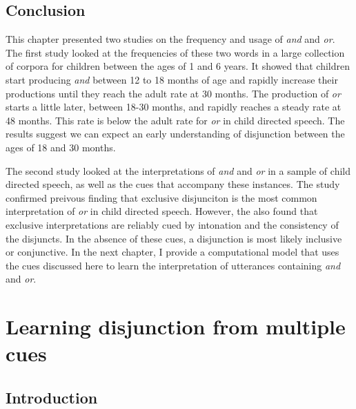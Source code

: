 \documentclass[oneside]{report}
\theoremstyle{definition}
\theoremstyle{definition}
\theoremstyle{definition}
\theoremstyle{remark}
\begin{document}
\section{Conclusion}\label{conclusion-1}

This chapter presented two studies on the frequency and usage of
\emph{and} and \emph{or}. The first study looked at the frequencies of
these two words in a large collection of corpora for children between
the ages of 1 and 6 years. It showed that children start producing
\emph{and} between 12 to 18 months of age and rapidly increase their
productions until they reach the adult rate at 30 months. The production
of \emph{or} starts a little later, between 18-30 months, and rapidly
reaches a steady rate at 48 months. This rate is below the adult rate
for \emph{or} in child directed speech. The results suggest we can
expect an early understanding of disjunction between the ages of 18 and
30 months.

The second study looked at the interpretations of \emph{and} and
\emph{or} in a sample of child directed speech, as well as the cues that
accompany these instances. The study confirmed preivous finding that
exclusive disjunciton is the most common interpretation of \emph{or} in
child directed speech. However, the also found that exclusive
interpretations are reliably cued by intonation and the consistency of
the disjuncts. In the absence of these cues, a disjunction is most
likely inclusive or conjunctive. In the next chapter, I provide a
computational model that uses the cues discussed here to learn the
interpretation of utterances containing \emph{and} and \emph{or}.

\chapter{Learning disjunction from multiple cues}\label{modeling}

\section{Introduction}\label{introduction-4}
\end{document}
